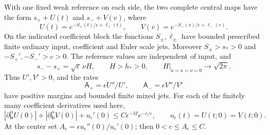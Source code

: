\begin{lemma}\label{rw:lower:regular-block}
With one fixed weak reference on each side, the two complete central
maps have the form $s_++U(t)$ and $s_-+V(v)$, where
\begin{equation}\label{rw:lower:regular-amplitudes}
 U(t)=e^{-S_+(t)/\epsilon+\ell_+(t)},\qquad
 V(v)=e^{-S_-(v)/\epsilon+\ell_-(v)}.
\end{equation}
On the indicated coefficient block the functions $S_\pm,\ell_\pm$
have bounded prescribed finite ordinary input, coefficient and Euler
scale jets. Moreover $S_\pm>s_*>0$ and
$-S_+',-S_-'>c>0$. The reference values are independent of input,
and
\begin{equation}\label{rw:lower:reference-gap}
 s_--s_+=\sqrt\epsilon\,\nu H,\qquad H>h_*>0,\qquad
 H|_{\bar a=\kappa=\nu=0}\longrightarrow\sqrt{2\pi}.
\end{equation}
Thus $U',V'>0$, and the rates
\[
 \mathsf A_+=\epsilon U''/U',\qquad
 \mathsf A_-=\epsilon V''/V'
\]
have positive margins and bounded finite mixed jets.
For each of the finitely many coefficient derivatives used here,
\begin{equation}\label{rw:lower:absolute-flat}
 |\partial_{\mathbf b}^{\alpha}U(0)|
 +|\partial_{\mathbf b}^{\alpha}V(0)|+u_\epsilon'(0)
 \le C\epsilon^{-M}e^{-c/\epsilon},
 \qquad u_\epsilon(t)=U(t;0)=V(t;0).
\end{equation}
At the center set
$A_\epsilon=\epsilon u_\epsilon''(0)/u_\epsilon'(0)$;
then $0<c\le A_\epsilon\le C$.
\end{lemma}

